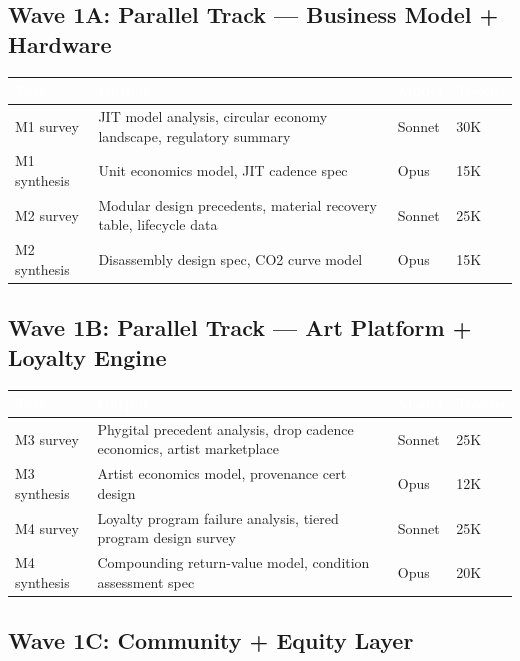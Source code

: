 \documentclass[11pt,letterpaper]{article}
\newcommand{\tableheader}[1]{\textbf{\sffamily\textcolor{white}{#1}}}
\begin{document}
\subsection{Wave 1A: Parallel Track --- Business Model + Hardware}

\begin{center}
\begin{tabularx}{\textwidth}{L{3cm}XC{2cm}C{2cm}}
\toprule
{}
\tableheader{Task} & \tableheader{Output} & \tableheader{Model} & \tableheader{Tokens} \\
\midrule
M1 survey & JIT model analysis, circular economy landscape, regulatory summary & Sonnet & 30K \\
M1 synthesis & Unit economics model, JIT cadence spec & Opus & 15K \\
M2 survey & Modular design precedents, material recovery table, lifecycle data & Sonnet & 25K \\
M2 synthesis & Disassembly design spec, CO2 curve model & Opus & 15K \\
\bottomrule
\end{tabularx}
\end{center}

\subsection{Wave 1B: Parallel Track --- Art Platform + Loyalty Engine}

\begin{center}
\begin{tabularx}{\textwidth}{L{3cm}XC{2cm}C{2cm}}
\toprule
{}
\tableheader{Task} & \tableheader{Output} & \tableheader{Model} & \tableheader{Tokens} \\
\midrule
M3 survey & Phygital precedent analysis, drop cadence economics, artist marketplace & Sonnet & 25K \\
M3 synthesis & Artist economics model, provenance cert design & Opus & 12K \\
M4 survey & Loyalty program failure analysis, tiered program design survey & Sonnet & 25K \\
M4 synthesis & Compounding return-value model, condition assessment spec & Opus & 20K \\
\bottomrule
\end{tabularx}
\end{center}

\subsection{Wave 1C: Community + Equity Layer}
\end{document}
